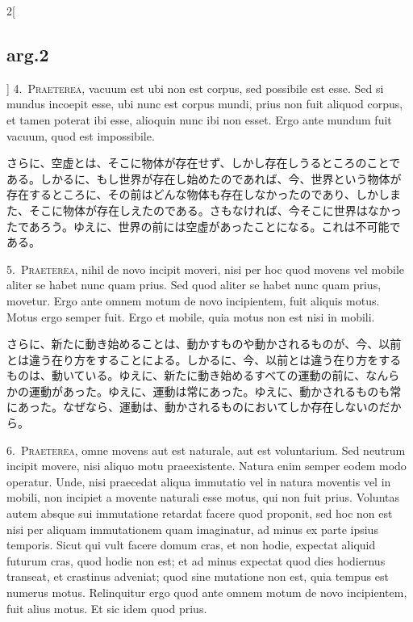 \documentclass[paper=a4paper,fontsize=10pt,jafontsize=9pt,titlepage]{jlreq}
\begin{document}
\begin{paracol}{2}[\subsection{arg.2}]
4.~{\scshape Praeterea}, vacuum est ubi non est corpus, sed possibile est esse. Sed
 si mundus incoepit esse, ubi nunc est corpus mundi, prius non fuit
 aliquod corpus, et tamen poterat ibi esse, alioquin nunc ibi non
 esset. Ergo ante mundum fuit vacuum, quod est impossibile.


\switchcolumn


さらに、空虚とは、そこに物体が存在せず、しかし存在しうるところのことで
ある。しかるに、もし世界が存在し始めたのであれば、今、世界という物体が
存在するところに、その前はどんな物体も存在しなかったのであり、しかしま
た、そこに物体が存在しえたのである。さもなければ、今そこに世界はなかっ
たであろう。ゆえに、世界の前には空虚があったことになる。これは不可能で
ある。




5.~{\scshape Praeterea}, nihil de novo incipit moveri, nisi per hoc quod movens vel
 mobile aliter se habet nunc quam prius. Sed quod aliter se habet nunc
 quam prius, movetur. Ergo ante omnem motum de novo incipientem, fuit
 aliquis motus. Motus ergo semper fuit. Ergo et mobile, quia motus non
 est nisi in mobili.


\switchcolumn


さらに、新たに動き始めることは、動かすものや動かされるものが、今、以前
とは違う在り方をすることによる。しかるに、今、以前とは違う在り方をする
ものは、動いている。ゆえに、新たに動き始めるすべての運動の前に、なんら
かの運動があった。ゆえに、運動は常にあった。ゆえに、動かされるものも常
にあった。なぜなら、運動は、動かされるものにおいてしか存在しないのだか
ら。




6.~{\scshape Praeterea}, omne movens aut est naturale, aut est voluntarium. Sed
 neutrum incipit movere, nisi aliquo motu praeexistente. Natura enim
 semper eodem modo operatur. Unde, nisi praecedat aliqua immutatio vel
 in natura moventis vel in mobili, non incipiet a movente naturali esse
 motus, qui non fuit prius. Voluntas autem absque sui immutatione
 retardat facere quod proponit, sed hoc non est nisi per aliquam
 immutationem quam imaginatur, ad minus ex parte ipsius temporis. Sicut
 qui vult facere domum cras, et non hodie, expectat aliquid futurum
 cras, quod hodie non est; et ad minus expectat quod dies hodiernus
 transeat, et crastinus adveniat; quod sine mutatione non est, quia
 tempus est numerus motus. Relinquitur ergo quod ante omnem motum de
 novo incipientem, fuit alius motus. Et sic idem quod prius.



\end{paracol}
\end{document}
